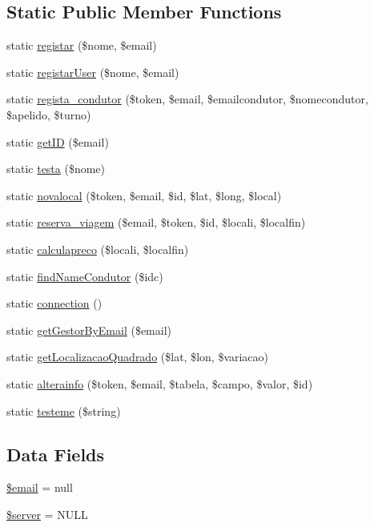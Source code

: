\subsection*{Static Public Member Functions}
\begin{DoxyCompactItemize}
\item 
static \hyperlink{class_admin_a68962f36927336274fe54d7076d1ee65}{registar} (\$nome, \$email)
\item 
static \hyperlink{class_admin_a793f81c7f4842a47d71b49984456f0f0}{registar\+User} (\$nome, \$email)
\item 
static \hyperlink{class_admin_a20706ee21acd9a973da99faa4112d20e}{regista\+\_\+condutor} (\$token, \$email, \$emailcondutor, \$nomecondutor, \$apelido, \$turno)
\item 
static \hyperlink{class_admin_a9a175cd84abaa45d80f05a09d7625351}{get\+I\+D} (\$email)
\item 
static \hyperlink{class_admin_a0efe0bcf80f6f5b41ac81b80cfb72c65}{testa} (\$nome)
\item 
static \hyperlink{class_admin_aba9752327ae42d3df79fb1437c9130bf}{novalocal} (\$token, \$email, \$id, \$lat, \$long, \$local)
\item 
static \hyperlink{class_admin_aceb249eefaec6a62c277546eb03d422f}{reserva\+\_\+viagem} (\$email, \$token, \$id, \$locali, \$localfin)
\item 
static \hyperlink{class_admin_a68588496a7dd88d68f01e8d274ff7612}{calculapreco} (\$locali, \$localfin)
\item 
static \hyperlink{class_admin_aaa785fca3a94cc63758a406ba5f4f0fd}{find\+Name\+Condutor} (\$idc)
\item 
static \hyperlink{class_admin_adaf659eb7f80210f9c14e20905fda1f3}{connection} ()
\item 
static \hyperlink{class_admin_a600505aca24b215f39f1d07e706fb9c0}{get\+Gestor\+By\+Email} (\$email)
\item 
static \hyperlink{class_admin_a11dc47c3bf86372319143d9d83467b03}{get\+Localizacao\+Quadrado} (\$lat, \$lon, \$variacao)
\item 
static \hyperlink{class_admin_a55f96b9a8b3f885fd6db6f7bf9d483ce}{alterainfo} (\$token, \$email, \$tabela, \$campo, \$valor, \$id)
\item 
static \hyperlink{class_admin_a64557a7cc0eccd0c96f3d9efa4f3dd87}{testeme} (\$string)
\end{DoxyCompactItemize}
\subsection*{Data Fields}
\begin{DoxyCompactItemize}
\item 
\hyperlink{class_admin_ad634f418b20382e2802f80532d76d3cd}{\$email} = null
\item 
\hyperlink{class_admin_ad135cc8a47e55f0829949cf62214170f}{\$server} = N\+U\+L\+L
\end{DoxyCompactItemize}


